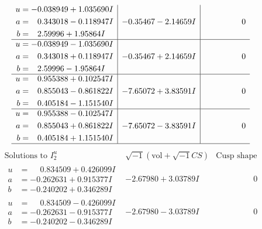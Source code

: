 \documentclass[1p]{elsarticle_modified}
\theoremstyle{definition}
\newcommand{\I}{\sqrt{-1}}
\begin{document}
$$\begin{array}{c|c|c}
\begin{aligned}
u &= -0.038949 + 1.035690 I \\
a &= \phantom{-}0.343018 - 0.118947 I \\
b &= \phantom{-}2.59996 + 1.95864 I\end{aligned}
 & -0.35467 - 2.14659 I & \phantom{-0.000000 } 0 \\ \hline\begin{aligned}
u &= -0.038949 - 1.035690 I \\
a &= \phantom{-}0.343018 + 0.118947 I \\
b &= \phantom{-}2.59996 - 1.95864 I\end{aligned}
 & -0.35467 + 2.14659 I & \phantom{-0.000000 } 0 \\ \hline\begin{aligned}
u &= \phantom{-}0.955388 + 0.102547 I \\
a &= \phantom{-}0.855043 - 0.861822 I \\
b &= \phantom{-}0.405184 - 1.151540 I\end{aligned}
 & -7.65072 + 3.83591 I & \phantom{-0.000000 } 0 \\ \hline\begin{aligned}
u &= \phantom{-}0.955388 - 0.102547 I \\
a &= \phantom{-}0.855043 + 0.861822 I \\
b &= \phantom{-}0.405184 + 1.151540 I\end{aligned}
 & -7.65072 - 3.83591 I & \phantom{-0.000000 } 0\\
 \hline 
 \end{array}$$\newpage$$\begin{array}{c|c|c}  
\text{Solutions to }I^u_{2}& \I (\text{vol} + \sqrt{-1}CS) & \text{Cusp shape}\\
 \hline 
\begin{aligned}
u &= \phantom{-}0.834509 + 0.426099 I \\
a &= -0.262631 + 0.915377 I \\
b &= -0.240202 + 0.346289 I\end{aligned}
 & -2.67980 + 3.03789 I & \phantom{-0.000000 } 0 \\ \hline\begin{aligned}
u &= \phantom{-}0.834509 - 0.426099 I \\
a &= -0.262631 - 0.915377 I \\
b &= -0.240202 - 0.346289 I\end{aligned}
 & -2.67980 - 3.03789 I & \phantom{-0.000000 } 0 \\ \hline\begin{aligned}

\end{aligned}
\end{array}$$
\end{document}
